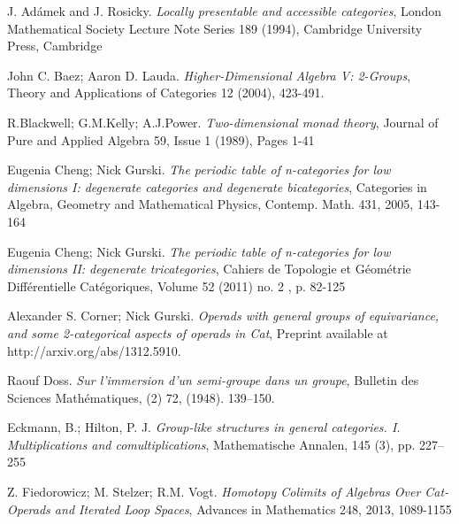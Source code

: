 \documentclass[a4paper,12pt,times,numbered,print,index]{Style/PhDThesisPSnPDF}
\numberwithin{equation}{section}
\theoremstyle{example}
\theoremstyle{named}
\begin{document}
\mainmatter

   



 

 
 
  


  
 \begin{thebibliography}{9}

J. Adámek and J. Rosicky.
\textit{ Locally presentable and accessible categories},
London Mathematical Society Lecture Note Series 189 (1994), Cambridge University Press, Cambridge  

John C. Baez; Aaron D. Lauda.
\textit{Higher-Dimensional Algebra V: 2-Groups},
Theory and Applications of Categories 12 (2004), 423-491.

R.Blackwell; G.M.Kelly; A.J.Power.
\textit{Two-dimensional monad theory},
Journal of Pure and Applied Algebra 59, Issue 1 (1989), Pages 1-41

Eugenia Cheng; Nick Gurski.
\textit{The periodic table of n-categories for low dimensions I: degenerate categories and degenerate bicategories},
Categories in Algebra, Geometry and Mathematical Physics, Contemp. Math. 431, 2005, 143-164

Eugenia Cheng; Nick Gurski.
\textit{The periodic table of n-categories for low dimensions II: degenerate tricategories},
Cahiers de Topologie et Géométrie Différentielle Catégoriques, Volume 52 (2011) no. 2 , p. 82-125

Alexander S. Corner; Nick Gurski.
\textit{Operads with general groups of equivariance, and some 2-categorical aspects of operads in Cat},
Preprint available at http://arxiv.org/abs/1312.5910.

Raouf Doss.
\textit{Sur l'immersion d'un semi-groupe dans un groupe},
Bulletin des Sciences Mathématiques, (2) 72, (1948). 139–150. 

Eckmann, B.; Hilton, P. J. 
\textit{Group-like structures in general categories. I. Multiplications and comultiplications},
Mathematische Annalen, 145 (3), pp. 227–255

Z. Fiedorowicz; M. Stelzer; R.M. Vogt.
\textit{Homotopy Colimits of Algebras Over
Cat-Operads and Iterated Loop Spaces},
Advances in Mathematics 248, 2013, 1089-1155


\end{thebibliography}
\end{document}
